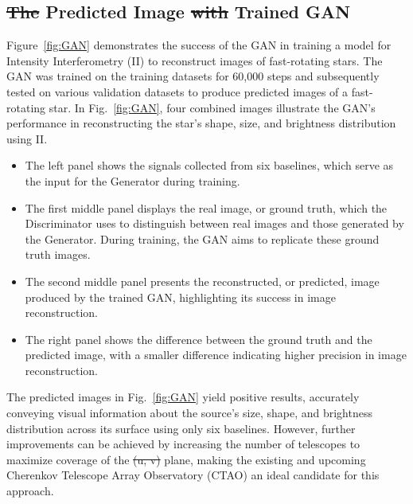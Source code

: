 \documentclass[fleqn,usenatbib,twocolumn]{mnras}
\makeatletter
\providecommand{\DIFadd}[1]{{\protect\color{blue}\uwave{#1}}} %
\providecommand{\DIFdel}[1]{{\protect\color{red}\sout{#1}}} %
\providecommand{\DIFaddbegin}{} %
\providecommand{\DIFaddend}{} %
\providecommand{\DIFdelbegin}{} %
\providecommand{\DIFdelend}{} %
\newcommand{\DIFscaledelfig}{0.5}
\newlength{\DIFdelgraphicswidth} %
\newlength{\DIFdelgraphicsheight} %
\newcommand{\DIFaddincludegraphics}[2][]{{\color{blue}\fbox{\DIFOincludegraphics[#1]{#2}}}} %
\newcommand{\DIFdelincludegraphics}[2][]{%
\sbox{\DIFdelgraphicsbox}{\DIFOincludegraphics[#1]{#2}}%
\settoboxwidth{\DIFdelgraphicswidth}{\DIFdelgraphicsbox} %
\settoboxtotalheight{\DIFdelgraphicsheight}{\DIFdelgraphicsbox} %
\scalebox{\DIFscaledelfig}{%
\parbox[b]{\DIFdelgraphicswidth}{\usebox{\DIFdelgraphicsbox}\\[-\baselineskip] \rule{\DIFdelgraphicswidth}{0em}}\llap{\resizebox{\DIFdelgraphicswidth}{\DIFdelgraphicsheight}{%
\setlength{\unitlength}{\DIFdelgraphicswidth}%
\begin{picture}(1,1)%
\thicklines\linethickness{2pt} %
{\color[rgb]{1,0,0}\put(0,0){\framebox(1,1){}}}%
{\color[rgb]{1,0,0}\put(0,0){\line( 1,1){1}}}%
{\color[rgb]{1,0,0}\put(0,1){\line(1,-1){1}}}%
\end{picture}%
}\hspace*{3pt}}} %
} %
\DeclareRobustCommand{\DIFaddbegin}{\DIFOaddbegin \let\includegraphics\DIFaddincludegraphics} %
\DeclareRobustCommand{\DIFaddend}{\DIFOaddend \let\includegraphics\DIFOincludegraphics} %
\DeclareRobustCommand{\DIFdelbegin}{\DIFOdelbegin \let\includegraphics\DIFdelincludegraphics} %
\DeclareRobustCommand{\DIFdelend}{\DIFOaddend \let\includegraphics\DIFOincludegraphics} %
\let\sout@orig\sout %
\renewcommand{\sout}[1]{\ifmmode\text{\sout@orig{\ensuremath{#1}}}\else\sout@orig{#1}\fi} %
\makeatother
\begin{document}
\subsection{\DIFdelbegin \DIFdel{The }\DIFdelend Predicted Image \DIFdelbegin \DIFdel{with }\DIFdelend \DIFaddbegin \DIFadd{from the }\DIFaddend Trained GAN}
Figure~\ref{fig:GAN} demonstrates the success of the GAN in training a model for Intensity Interferometry (II) to reconstruct images of fast-rotating stars. The GAN was trained on the training datasets for 60,000 steps and subsequently tested on various validation datasets to produce predicted images of a fast-rotating star. In Fig.~\ref{fig:GAN}, four combined images illustrate the GAN's performance in reconstructing the star’s shape, size, and brightness distribution using II.
\begin{itemize}
\item{The left panel shows the signals collected from six baselines, which serve as the input for the Generator during training.}
\item{The first middle panel displays the real image, or ground truth, which the Discriminator uses to distinguish between real images and those generated by the Generator. During training, the GAN aims to replicate these ground truth images.}
\item{The second middle panel presents the reconstructed, or predicted, image produced by the trained GAN, highlighting its success in image reconstruction.}
\item{The right panel shows the difference between the ground truth and the predicted image, with a smaller difference indicating higher precision in image reconstruction.}
\end{itemize}
The predicted images in Fig.~\ref{fig:GAN} yield positive results, accurately conveying visual information about the source's size, shape, and brightness distribution across its surface using only six baselines. However, further improvements can be achieved by increasing the number of telescopes to maximize coverage of the \DIFdelbegin \DIFdel{(u, v) }\DIFdelend \DIFaddbegin \DIFadd{$(u, v)$ }\DIFaddend plane, making the existing and upcoming Cherenkov Telescope Array Observatory (CTAO) an ideal candidate for this approach.
\end{document}
